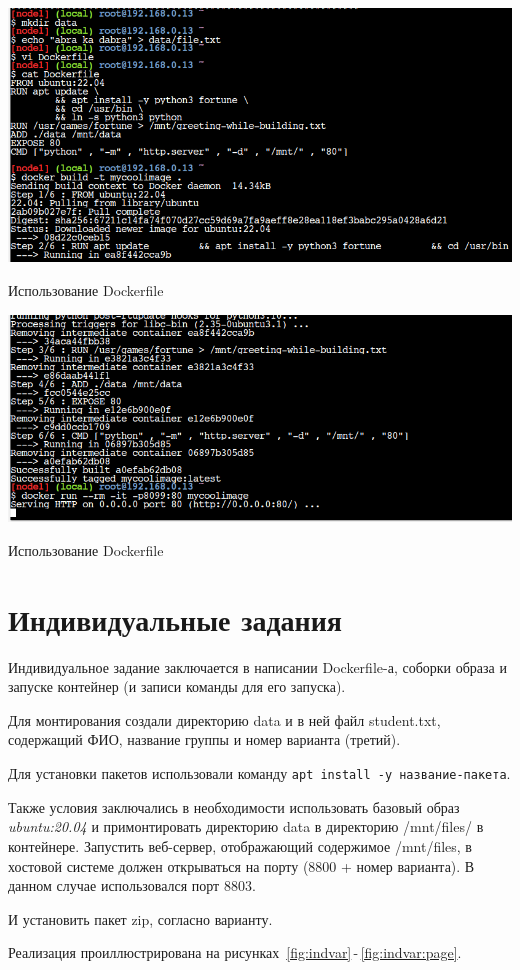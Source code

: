 \begin{image}
	\includegraphics[width=1\textwidth]{Screenshot from 2023-04-15 21-07-19}
	\caption{Использование Dockerfile}
	\label{fig:dockerfile}
\end{image}

\begin{image}
	\includegraphics[width=1\textwidth]{Screenshot from 2023-04-15 21-08-59}
	\caption{Использование Dockerfile}
	\label{fig:dockerfile:run}
\end{image}

\section{Индивидуальные задания}
Индивидуальное задание заключается в написании Dockerfile-а,
соборки образа и запуске контейнер
(и записи команды для его запуска).\par
Для монтирования создали директорию data и в ней файл student.txt,
содержащий ФИО, название группы и номер варианта (третий).\par
Для установки пакетов использовали команду
\texttt{apt install -y название-пакета}.\par
Также условия заключались в необходимости использовать
базовый образ \textit{ubuntu:20.04}
и примонтировать директорию data в директорию /mnt/files/ в контейнере.
Запустить веб-сервер, отображающий содержимое /mnt/files, в хостовой
системе должен открываться на порту (8800 + номер варианта).
В данном случае использовался порт 8803.\par
И установить пакет zip, согласно варианту.\par
Реализация проиллюстрирована
на рисунках~\ref{fig:indvar}\,-\,\ref{fig:indvar:page}.

